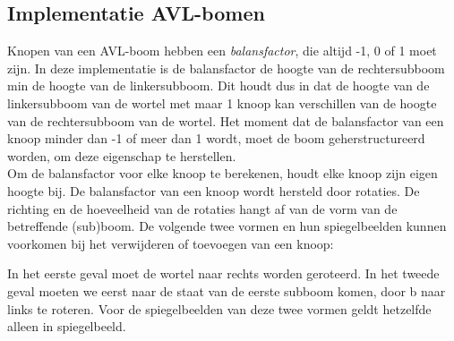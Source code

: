 \documentclass[a4paper,10pt]{article}
\begin{document}
\subsection{Implementatie AVL-bomen}
Knopen van een AVL-boom hebben een \emph{balansfactor}, die altijd -1, 0 of 1 moet zijn. In deze implementatie is de balansfactor de hoogte van de rechtersubboom min de hoogte van de linkersubboom. Dit houdt dus in dat de hoogte van de linkersubboom van de wortel met maar 1 knoop kan verschillen van de hoogte van de rechtersubboom van de wortel. Het moment dat de balansfactor van een knoop minder dan -1 of meer dan 1 wordt, moet de boom geherstructureerd worden, om deze eigenschap te herstellen. \\

Om de balansfactor voor elke knoop te berekenen, houdt elke knoop zijn eigen hoogte bij. De balansfactor van een knoop wordt hersteld door rotaties. De richting en de hoeveelheid van de rotaties hangt af van de vorm van de betreffende (sub)boom. De volgende twee vormen en hun spiegelbeelden kunnen voorkomen bij het verwijderen of toevoegen van een knoop: \\

\begin{center}
\end{center}

In het eerste geval moet de wortel naar rechts worden geroteerd. In het tweede geval moeten we eerst naar de staat van de eerste subboom komen, door b naar links te roteren. Voor de spiegelbeelden van deze twee vormen geldt hetzelfde alleen in spiegelbeeld. \\
\end{document}
